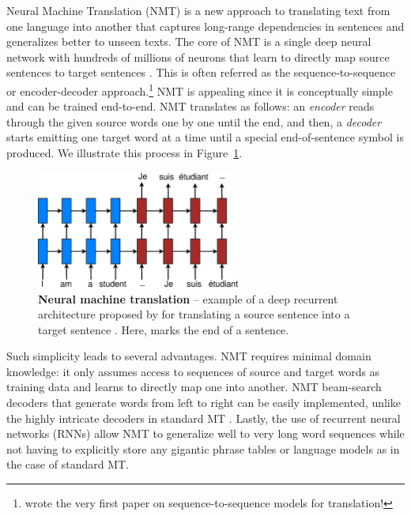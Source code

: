 Neural Machine Translation (NMT) is a new approach to translating text from one
language into another that captures long-range dependencies in sentences and
generalizes better to unseen texts. The core of NMT is a single deep neural
network with hundreds of millions of neurons that learn to directly map source
sentences to target sentences \cite{kal13,sutskever14,cho14}. 
This is often referred as the sequence-to-sequence or encoder-decoder
approach.\footnote{ wrote the very first paper on sequence-to-sequence models for translation!}
NMT is appealing since it is conceptually
simple and can be trained
end-to-end. NMT translates as follows: an {\it encoder} reads through the given source
words one by one until the
end, and then, a {\it decoder} starts emitting one target
word at a time until a special end-of-sentence symbol is produced. We illustrate
this process in Figure~\ref{f:nmt}. 

\begin{figure}[tbh!]
\centering
\includegraphics[width=0.6\textwidth, clip=true, trim= 0 0 0
0]{img/nmt_basic.eps} %
\caption[Neural machine translation]{{\bf Neural machine translation} -- example of a deep recurrent
architecture proposed by  for
translating a source sentence  into a target sentence
. Here, \word{\texttt{\_}} marks the end of a sentence.
} 
\label{f:nmt}
\end{figure}

Such simplicity leads to several advantages. 
NMT requires minimal domain knowledge: it only assumes access to
sequences of source and target words as training data and learns to directly
map one into another. NMT beam-search decoders that
generate words from left to right can be easily implemented, unlike the highly
intricate decoders in standard MT \cite{Koehn:2003:SMT}. Lastly, the use of
recurrent neural networks (RNNs) allow NMT to generalize well to very long word
sequences while not having to 
explicitly store any gigantic
phrase tables or language models as in the case of standard MT.

